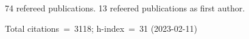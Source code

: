 74 refereed publications. 13 refeered publications as first author.

Total citations~=~3118; h-index~=~31 (2023-02-11)